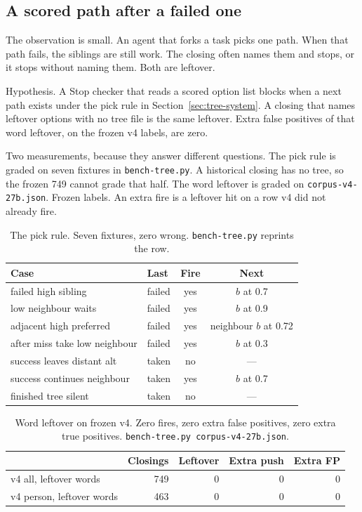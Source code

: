 \subsection{A scored path after a failed one}
\label{sec:tree}

The observation is small. An agent that forks a task picks one
path. When that path fails, the siblings are still work. The
closing often names them and stops, or it stops without naming
them. Both are leftover.

Hypothesis. A Stop checker that reads a scored option list blocks
when a next path exists under the pick rule in
Section~\ref{sec:tree-system}. A closing that names leftover
options with no tree file is the same leftover. Extra false
positives of that word leftover, on the frozen v4 labels, are
zero.

Two measurements, because they answer different questions. The
pick rule is graded on seven fixtures in \texttt{bench-tree.py}.
A historical closing has no tree, so the frozen 749 cannot grade
that half. The word leftover is graded on
\texttt{corpus-v4-27b.json}. Frozen labels. An extra fire is a
leftover hit on a row v4 did not already fire.

\begin{table}[ht]
\centering
{\small\begin{tabular}{llcc}
\toprule
Case & Last & Fire & Next \\
\midrule
failed high sibling & failed & yes & $b$ at 0.7 \\
low neighbour waits & failed & yes & $b$ at 0.9 \\
adjacent high preferred & failed & yes & neighbour $b$ at 0.72 \\
after miss take low neighbour & failed & yes & $b$ at 0.3 \\
success leaves distant alt & taken & no & --- \\
success continues neighbour & taken & yes & $b$ at 0.7 \\
finished tree silent & taken & no & --- \\
\bottomrule
\end{tabular}}
\caption{The pick rule. Seven fixtures, zero wrong.
\texttt{bench-tree.py} reprints the row.}
\label{tab:tree-pick}
\end{table}

\begin{table}[ht]
\centering
{\small\begin{tabular}{lrrrr}
\toprule
 & Closings & Leftover & Extra push & Extra FP \\
\midrule
v4 all, leftover words & 749 & 0 & 0 & 0 \\
v4 person, leftover words & 463 & 0 & 0 & 0 \\
\bottomrule
\end{tabular}}
\caption{Word leftover on frozen v4. Zero fires, zero extra false
positives, zero extra true positives.
\texttt{bench-tree.py corpus-v4-27b.json}.}
\label{tab:tree-words}
\end{table}

